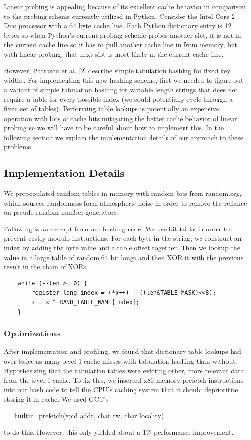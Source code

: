 \documentclass[11pt]{article}
\begin{document}
Linear probing is appealing because of its excellent cache behavior in comparison to the probing scheme currently utilized in Python.  Consider the Intel Core 2 Duo processor with a 64 byte cache line.  Each Python dictionary entry is 12 bytes so when Python’s current probing scheme probes another slot, it is not in the current cache line so it has to pull another cache line in from memory, but with linear probing, that next slot is most likely in the current cache line.

However, Patrascu et al. [2] describe simple tabulation hashing for fixed key widths.  For implementing this new hashing scheme, first we needed to figure out a variant of simple tabulation hashing for variable length strings that does not require a table for every possible index (we could potentially cycle through a fixed set of tables).  Performing table lookups is potentially an expensive operation with lots of cache hits mitigating the better cache behavior of linear probing so we will have to be careful about how to implement this. In the following section we explain the implementation details of our approach to these problems.

\subsection{Implementation Details}
We prepopulated random tables in memory with random bits from random.org, which
sources randomness form atmospheric noise in order to remove the reliance on
pseudo-random number generators.
      

      Following is an excerpt from our hashing code.  We use bit tricks in
      order to prevent costly modulo instructions.  For each byte in the
      string, we construct an index by adding the byte value and a table offset
      together.  Then we lookup the value in a large table of random 64 bit
      longs and then XOR it with the previous result in the chain of XORs.

       \begin{verbatim}
    while (--len >= 0) {
        register long index = (*p++) | ((len&TABLE_MASK)<<8);
        x = x ^ RAND_TABLE_NAME[index];
    }
       \end{verbatim}

\subsubsection{Optimizations}

After implementation and profiling, we found that dictionary table lookups had
over twice as many level 1 cache misses with tabulation hashing than without.
Hypothesizing that the tabulation tables were evicting other, more relevant
data from the level 1 cache.  To fix this, we inserted x86 memory prefetch
instructions into our hash code to tell the CPU's caching system that it should
deprioritize storing it in cache.  We used GCC's
\begin{tt}\_\_builtin\_prefetch(void \*addr, char rw, char locality)\end{tt}
to do this.  However, this only yielded about a 1\% performance improvement.
\end{document}
